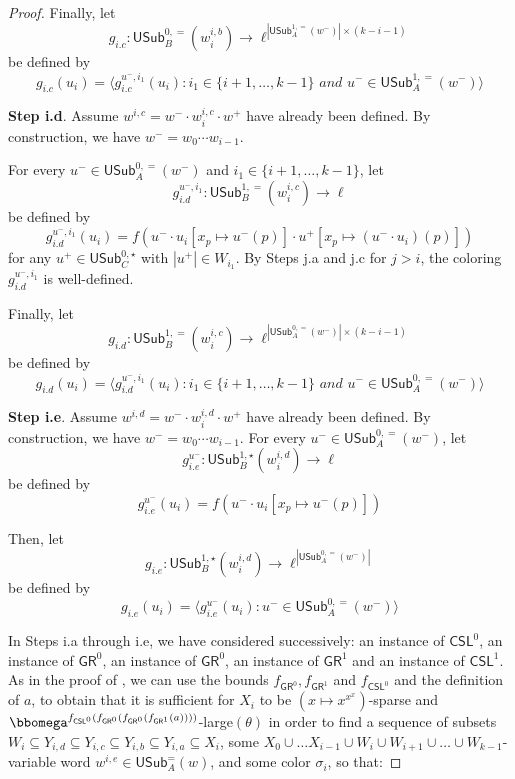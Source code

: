 \documentclass{article}
\numberwithin{theorem}{section}
\newcommand{\CSL}{\mathsf{CSL}}
\newcommand{\GR}{\mathsf{GR}}
\newcommand{\USub}{\mathsf{USub}}
\begin{document}
\begin{proof}
Finally, let $$g_{i.c} : \USub_{B}^{0,=}(w^{i,b}_i) \to \ell^{|\USub_A^{1,=}(w^-)|\times (k-i-1)}$$ be defined by $$g_{i.c}(u_i) = \langle g_{i.c}^{u^-,i_1}(u_i) : i_1 \in \{i+1, \dots, k-1\} \textit{ and } u^- \in \USub_A^{1,=}(w^-) \rangle$$
\smallskip

\noindent
\textbf{Step i.d}. Assume $w^{i,c} = w^- \cdot w^{i,c}_i \cdot w^+$ have already been defined. By construction, we have $w^- = w_0 \cdots w_{i-1}$.

For every $u^- \in \USub_A^{0,=}(w^-)$ and $i_1 \in \{i+1, \dots, k-1\}$, let $$g_{i.d}^{u^-,i_1} : \USub_B^{1,=}(w^{i,c}_i) \to \ell$$ be defined by  
$$g_{i.d}^{u^-,i_1}(u_i) = f(u^- \cdot u_i[x_p \mapsto u^-(p)] \cdot u^+[x_p \mapsto (u^- \cdot u_i)(p)])$$ for any $u^+ \in \USub_{C}^{0,\star}$ with $|u^+| \in W_{i_1}$. By Steps j.a and j.c for $j > i$, the coloring $g_{i.d}^{u^-,i_1}$ is well-defined.

Finally, let $$g_{i.d} : \USub_B^{1,=}(w^{i,c}_i) \to \ell^{|\USub_A^{0,=}(w^-)|\times (k-i-1)}$$ be defined by $$g_{i.d}(u_i) = \langle g_{i.d}^{u^-,i_1}(u_i) : i_1 \in \{i+1, \dots, k-1\} \textit{ and } u^- \in \USub_A^{0,=}(w^-) \rangle$$
\smallskip

\noindent
\textbf{Step i.e}. Assume $w^{i,d} = w^- \cdot w^{i,d}_i \cdot w^+$ have already been defined. By construction, we have $w^- = w_0 \cdots w_{i-1}$. 
For every $u^- \in \USub_A^{0,=}(w^-)$, let $$g_{i.e}^{u^-} : \USub_B^{1,\star}(w^{i,d}_i) \to \ell$$ be defined by 
$$g_{i.e}^{u^-}(u_i) = f(u^- \cdot u_i[x_p \mapsto u^-(p)])$$

Then, let $$g_{i.e} : \USub_B^{1,\star}(w^{i,d}_i) \to \ell^{|\USub_A^{0,=}(w^-)|}$$ be defined by $$g_{i.e}(u_i) = \langle g_{i.e}^{u^-}(u_i) : u^- \in \USub_A^{0,=}(w^-)\rangle$$

\smallskip
In Steps i.a through i.e, we have considered successively: an instance of $\CSL^0$, an instance of $\GR^0$, an instance of $\GR^0$, an instance of $\GR^1$ and an instance of $\CSL^1$. As in the proof of , we can use the bounds $f_{\GR^0}, f_{\GR^1}$ and $f_{\CSL^0}$ and the definition of $a$, to obtain that it is sufficient for $X_i$ to be $(x \mapsto x^{x^x})$-sparse and $\bbomega^{f_{\CSL^0}(f_{\GR^0}(f_{\GR^0}(f_{\GR^1}(a))))}$-large$(\theta)$ in order to find a sequence of subsets $W_i \subseteq Y_{i,d} \subseteq Y_{i,c} \subseteq Y_{i,b} \subseteq Y_{i,a} \subseteq X_i$, some $X_0 \cup \dots X_{i-1} \cup W_i \cup W_{i+1} \cup \dots \cup W_{k-1}$-variable word $w^{i,e} \in \USub_A^{=}(w)$, and some color $\sigma_i$, so that:


\end{proof}
\end{document}
